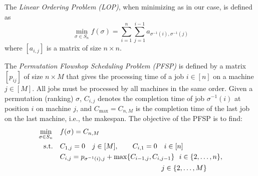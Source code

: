 \documentclass[sigconf,dvipsnames]{acmart}
\begin{document}
The \emph{Linear Ordering Problem (LOP)}, when minimizing as in our case, is defined as
\begin{equation}\label{eq:lop}
  \min_{\sigma \in S_n} f(\sigma) = \sum_{i=1}^{n} \sum_{j=1}^{i-1}  a_{\sigma^{-1}(i), \sigma^{-1}(j)}
\end{equation}
%
where $[a_{i,j}]$ is a matrix of size $n \times n$.


The \emph{Permutation Flowshop Scheduling Problem (PFSP)} is defined by a matrix $[p_{ij}]$ of size $n \times M$ that gives the processing time of a job $i \in [n]$ on a machine $j \in [M]$. All jobs must be processed by all machines in the same order. Given a permutation (ranking) $\sigma$, $C_{i,j}$ denotes the completion time of job $\sigma^{-1}(i)$ at position $i$ on machine $j$, and $C_{\max} = C_{n,M}$  is the completion time of the last job on the last machine, i.e., the makespan. The objective of the PFSP is to find:
\begin{equation}\label{eq:pfsp}
  \begin{split}
    \min_{\sigma \in S_n}\quad& f(\sigma) = C_{n,M}\\
    \text{s.t.}\quad & C_{1,j} = 0 \quad j\in [M], \qquad C_{i,1} = 0\quad i \in [n]\\
    &C_{i,j} = p_{\sigma^{-1}(i),j} + \max\{C_{i-1, j}, C_{i, j-1}\}  \ \  i \in \{2,\dotsc,n\},\\
    &\hspace{14.5em} j \in\{2,\dotsc, M\}
  \end{split}
\end{equation}
\end{document}
